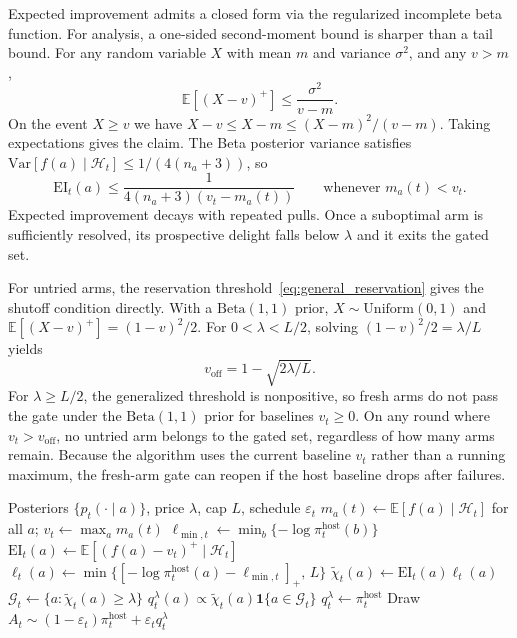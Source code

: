 \documentclass{article}
\newcommand{\Gc}{\mathcal{G}}
\newcommand{\Ac}{\mathcal{A}}
\newcommand{\Hc}{\mathcal{H}}
\newcommand{\E}{\mathbb{E}}
\newcommand{\one}{\mathbf{1}}
\newcommand{\Var}{\mathrm{Var}}
\newcommand{\surp}{\ell} %
\newcommand{\delight}{\chi} %
\newcommand{\EI}{\mathrm{EI}} %
\begin{document}
Expected improvement admits a closed form via the regularized incomplete beta function.
For analysis, a one-sided second-moment bound is sharper than a tail bound.
For any random variable $X$ with mean $m$ and variance $\sigma^2$, and any $v>m$,
\begin{equation}
\label{eq:ei_second_moment}
\E[(X-v)^+] \le \frac{\sigma^2}{v-m}.
\end{equation}
On the event $X\ge v$ we have $X-v\le X-m\le (X-m)^2/(v-m)$.
Taking expectations gives the claim.
The Beta posterior variance satisfies $\Var[f(a)\mid\Hc_t] \le 1/(4(n_a+3))$, so
\begin{equation}
\label{eq:beta_ei}
\EI_t(a) \le \frac{1}{4(n_a+3)(v_t - m_a(t))} \qquad\text{whenever }m_a(t)<v_t.
\end{equation}
Expected improvement decays with repeated pulls.
Once a suboptimal arm is sufficiently resolved, its prospective delight falls below $\lambda$ and it exits the gated set.

For untried arms, the reservation threshold~\eqref{eq:general_reservation} gives the shutoff condition directly.
With a $\mathrm{Beta}(1,1)$ prior, $X\sim\mathrm{Uniform}(0,1)$ and $\E[(X-v)^+]=(1-v)^2/2$.
For $0<\lambda<L/2$, solving $(1-v)^2/2=\lambda/L$ yields
\begin{equation}
\label{eq:fresharm}
v_{\mathrm{off}} = 1 - \sqrt{2\lambda/L}.
\end{equation}
For $\lambda\ge L/2$, the generalized threshold is nonpositive, so fresh arms do not pass the gate under the $\mathrm{Beta}(1,1)$ prior for baselines $v_t\ge 0$.
On any round where $v_t > v_{\mathrm{off}}$, no untried arm belongs to the gated set, regardless of how many arms remain.
Because the algorithm uses the current baseline $v_t$ rather than a running maximum, the fresh-arm gate can reopen if the host baseline drops after failures.




\begin{center}
\begin{minipage}{0.88\columnwidth}
\begin{algorithm}[H]
\caption{Delight-gated exploration}
\label{alg:explore}
\begin{algorithmic}[1]
\Require Posteriors $\{p_t(\cdot\mid a)\}$, price $\lambda$, cap $L$, schedule $\varepsilon_t$
\State $m_a(t) \gets \E[f(a)\mid\Hc_t]$ for all $a$; \quad $v_t \gets \max_a m_a(t)$
\State $\ell_{\min,t} \gets \min_b\{-\log \pi_t^{\mathrm{host}}(b)\}$
\For{each $a\in\Ac$}
    \State $\EI_t(a) \gets \E[(f(a)-v_t)^+\mid\Hc_t]$
    \State $\surp_t(a) \gets \min\{[-\log \pi_t^{\mathrm{host}}(a)-\ell_{\min,t}]_+,\,L\}$
    \State $\tilde{\delight}_t(a) \gets \EI_t(a)\surp_t(a)$
\EndFor
\State $\Gc_t \gets \{a : \tilde{\delight}_t(a) \ge \lambda\}$
\If{$\Gc_t \ne \emptyset$}
    \State $q_t^\lambda(a) \propto \tilde{\delight}_t(a)\one\{a\in\Gc_t\}$
\Else
    \State $q_t^\lambda \gets \pi_t^{\mathrm{host}}$
\EndIf
\State Draw $A_t \sim (1-\varepsilon_t)\pi_t^{\mathrm{host}} + \varepsilon_t q_t^\lambda$
\end{algorithmic}
\end{algorithm}
\end{minipage}
\end{center}
\end{document}
